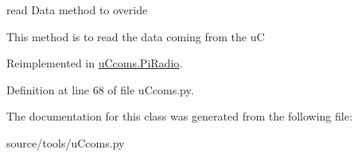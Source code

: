 read Data method to overide 

This method is to read the data coming from the uC 

Reimplemented in \mbox{\hyperlink{classu_ccoms_1_1_pi_radio_a319c15c0bf996c01e7b6032c56292ffe}{u\+Ccoms.\+Pi\+Radio}}.



Definition at line 68 of file u\+Ccoms.\+py.



The documentation for this class was generated from the following file\+:\begin{DoxyCompactItemize}
\item 
source/tools/u\+Ccoms.\+py\end{DoxyCompactItemize}
